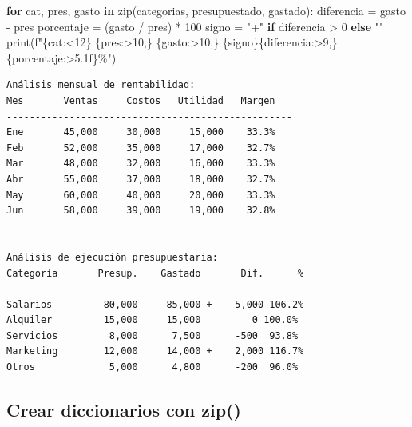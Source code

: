 \documentclass[
  doc,
  floatsintext,
  longtable,
  a4paper,
  nolmodern,
  notxfonts,
  notimes,
  12pt,
  colorlinks=true,linkcolor=blue,citecolor=blue,urlcolor=blue]{apa7}
\newenvironment{Shaded}{\begin{snugshade}}{\end{snugshade}}
\newcommand{\BuiltInTok}[1]{\textcolor[rgb]{0.00,0.23,0.31}{#1}}
\newcommand{\ControlFlowTok}[1]{\textcolor[rgb]{0.00,0.23,0.31}{\textbf{#1}}}
\newcommand{\DecValTok}[1]{\textcolor[rgb]{0.68,0.00,0.00}{#1}}
\newcommand{\KeywordTok}[1]{\textcolor[rgb]{0.00,0.23,0.31}{\textbf{#1}}}
\newcommand{\NormalTok}[1]{\textcolor[rgb]{0.00,0.23,0.31}{#1}}
\newcommand{\OperatorTok}[1]{\textcolor[rgb]{0.37,0.37,0.37}{#1}}
\newcommand{\SpecialCharTok}[1]{\textcolor[rgb]{0.37,0.37,0.37}{#1}}
\newcommand{\SpecialStringTok}[1]{\textcolor[rgb]{0.13,0.47,0.30}{#1}}
\newcommand{\StringTok}[1]{\textcolor[rgb]{0.13,0.47,0.30}{#1}}
\begin{document}
\begin{Shaded}
\begin{Highlighting}[]
\ControlFlowTok{for}\NormalTok{ cat, pres, gasto }\KeywordTok{in} \BuiltInTok{zip}\NormalTok{(categorias, presupuestado, gastado):}
\NormalTok{    diferencia }\OperatorTok{=}\NormalTok{ gasto }\OperatorTok{{-}}\NormalTok{ pres}
\NormalTok{    porcentaje }\OperatorTok{=}\NormalTok{ (gasto }\OperatorTok{/}\NormalTok{ pres) }\OperatorTok{*} \DecValTok{100}
\NormalTok{    signo }\OperatorTok{=} \StringTok{"+"} \ControlFlowTok{if}\NormalTok{ diferencia }\OperatorTok{\textgreater{}} \DecValTok{0} \ControlFlowTok{else} \StringTok{""}
    \BuiltInTok{print}\NormalTok{(}\SpecialStringTok{f"}\SpecialCharTok{\{}\NormalTok{cat}\SpecialCharTok{:\textless{}12\}}\SpecialStringTok{ }\SpecialCharTok{\{}\NormalTok{pres}\SpecialCharTok{:\textgreater{}10,\}}\SpecialStringTok{ }\SpecialCharTok{\{}\NormalTok{gasto}\SpecialCharTok{:\textgreater{}10,\}}\SpecialStringTok{ }\SpecialCharTok{\{}\NormalTok{signo}\SpecialCharTok{\}\{}\NormalTok{diferencia}\SpecialCharTok{:\textgreater{}9,\}}\SpecialStringTok{ }\SpecialCharTok{\{}\NormalTok{porcentaje}\SpecialCharTok{:\textgreater{}5.1f\}}\SpecialStringTok{\%"}\NormalTok{)}
\end{Highlighting}
\end{Shaded}

\begin{verbatim}
Análisis mensual de rentabilidad:
Mes       Ventas     Costos   Utilidad   Margen
--------------------------------------------------
Ene       45,000     30,000     15,000    33.3%
Feb       52,000     35,000     17,000    32.7%
Mar       48,000     32,000     16,000    33.3%
Abr       55,000     37,000     18,000    32.7%
May       60,000     40,000     20,000    33.3%
Jun       58,000     39,000     19,000    32.8%


Análisis de ejecución presupuestaria:
Categoría       Presup.    Gastado       Dif.      %
-------------------------------------------------------
Salarios         80,000     85,000 +    5,000 106.2%
Alquiler         15,000     15,000         0 100.0%
Servicios         8,000      7,500      -500  93.8%
Marketing        12,000     14,000 +    2,000 116.7%
Otros             5,000      4,800      -200  96.0%
\end{verbatim}

\subsection{Crear diccionarios con
zip()}\label{crear-diccionarios-con-zip}
\end{document}
